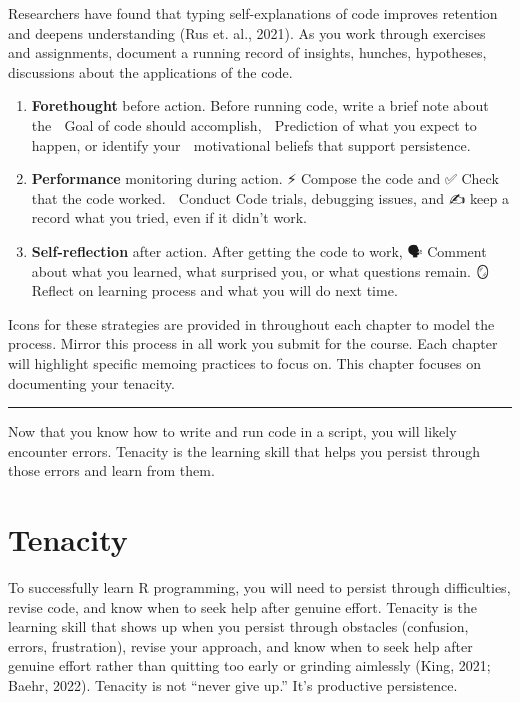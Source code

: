 \documentclass[
  12pt,
]{scrreprt}
\begin{document}
Researchers have found that typing self-explanations of code improves
retention and deepens understanding (Rus et. al., 2021). As you work
through exercises and assignments, document a running record of
insights, hunches, hypotheses, discussions about the applications of the
code.

\begin{enumerate}
\def\labelenumi{\arabic{enumi}.}
\item
  \textbf{Forethought} before action. Before running code, write a brief
  note about the 🎯 Goal of code should accomplish, 💬 Prediction of
  what you expect to happen, or identify your 🧠 motivational beliefs
  that support persistence.
\item
  \textbf{Performance} monitoring during action. ⚡ Compose the code and
  ✅ Check that the code worked. 🚀 Conduct Code trials, debugging
  issues, and ✍️ keep a record what you tried, even if it didn't work.
\item
  \textbf{Self-reflection} after action. After getting the code to work,
  🗣 Comment about what you learned, what surprised you, or what
  questions remain. 🪞 Reflect on learning process and what you will do
  next time.
\end{enumerate}

Icons for these strategies are provided in throughout each chapter to
model the process. Mirror this process in all work you submit for the
course. Each chapter will highlight specific memoing practices to focus
on. This chapter focuses on documenting your tenacity.

\begin{center}\rule{0.5\linewidth}{0.5pt}\end{center}

Now that you know how to write and run code in a script, you will likely
encounter errors. Tenacity is the learning skill that helps you persist
through those errors and learn from them.

\chapter{Tenacity}\label{tenacity}

To successfully learn R programming, you will need to persist through
difficulties, revise code, and know when to seek help after genuine
effort. Tenacity is the learning skill that shows up when you persist
through obstacles (confusion, errors, frustration), revise your
approach, and know when to seek help after genuine effort rather than
quitting too early or grinding aimlessly (King, 2021; Baehr, 2022).
Tenacity is not ``never give up.'' It's productive persistence.
\end{document}
